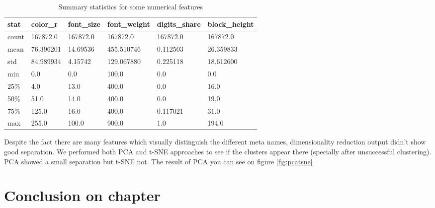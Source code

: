 \begin{table}[h]
\begin{center}
{\renewcommand{\arraystretch}{1.5}
\begin{tabular}{| p{0.8cm} | p{2cm}|  p{2cm}|  p{2.3cm}|  p{2.3cm}|  p{2.4cm}|}
\hline
\textbf{stat}    &    \textbf{color\_r}    &    \textbf{font\_size}    &    \textbf{font\_weight}    &    \textbf{digits\_share}    &    \textbf{block\_height}\\
\hline
count    &    167872.0    &    167872.0    &    167872.0    &    167872.0    &    167872.0\\
\hline
mean    &    76.396201    &    14.69536    &    455.510746    &    0.112503    &    26.359833\\
\hline
std    &    84.989934    &    4.15742    &    129.067880    &    0.225118    &    18.612600\\
\hline
min    &    0.0    &    0.0    &    100.0    &    0.0    &    0.0\\
\hline
25\%    &    4.0    &    13.0    &    400.0    &    0.0    &    16.0\\
\hline
50\%    &    51.0    &    14.0    &    400.0    &    0.0    &    19.0\\
\hline
75\%    &    125.0    &    16.0    &    400.0    &    0.117021    &    31.0\\
\hline
max    &    255.0    &    100.0    &    900.0    &    1.0    &    194.0\\
\hline
\end{tabular}}
\caption{Summary statistics for some numerical features}
\label{table:sumstatnum}
\end{center}
\end{table}    

Despite the fact there are many features which visually distinguish the different meta names, dimensionality reduction output didn't show good separation. We performed both PCA and t-SNE approaches to see if the clusters appear there (specially after unsuccessful clustering). PCA showed a small separation but t-SNE not. The result of PCA you can see on figure \ref{fig:pcatsne}


\section*{Conclusion on chapter}